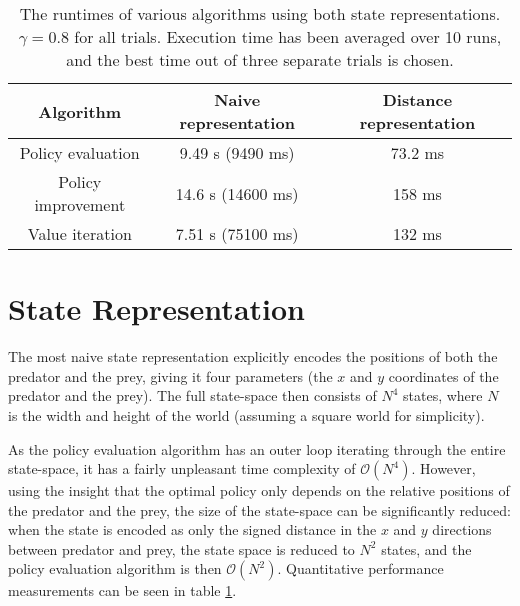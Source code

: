 \documentclass[a4paper, 12pt]{article}
\begin{document}
\begin{table}[htb]
	\begin{tabular}{|c|c|c|}
		\hline
		Algorithm & Naive representation & Distance representation \\
		\hline
		Policy evaluation & 9.49 s (9490 ms) & 73.2 ms \\
		Policy improvement & 14.6 s (14600 ms) & 158 ms \\
		Value iteration & 7.51 s (75100 ms)& 132 ms \\
		\hline
	\end{tabular}
	\caption{The runtimes of various algorithms using both state representations.
		$\gamma = 0.8$ for all trials. Execution time has been averaged over 10
		runs, and the best time out of three separate trials is chosen.}
	\label{tbl:performance}
\end{table}

\section*{State Representation}
The most naive state representation explicitly encodes the positions of both the
predator and the prey, giving it four parameters (the $x$ and $y$ coordinates of
the predator and the prey). The full state-space then consists of $N^4$ states,
where $N$ is the width and height of the world (assuming a square world for
simplicity).

As the policy evaluation algorithm has an outer loop iterating through the
entire state-space, it has a fairly unpleasant time complexity of
$\mathcal{O}(N^4)$. However, using the insight that the optimal policy only
depends on the relative positions of the predator and the prey, the size of the
state-space can be significantly reduced: when the state is encoded as only the
signed distance in the $x$ and $y$ directions between predator and prey, the
state space is reduced to $N^2$ states, and the policy evaluation algorithm is
then $\mathcal{O}(N^2)$. Quantitative performance measurements can be seen in table
\ref{tbl:performance}.
\end{document}
